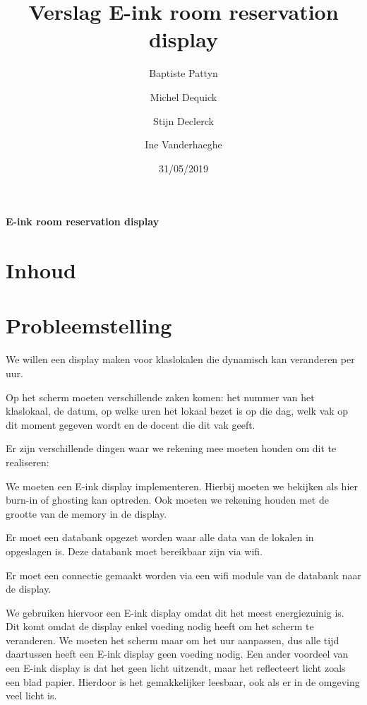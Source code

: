 \documentclass[a4paper,kul]{kulakarticle} %
\date{31/05/2019}
\title{Verslag E-ink room reservation display}
\author{Baptiste Pattyn\and Michel Dequick \and Stijn Declerck \and Ine Vanderhaeghe}
\begin{document}
\maketitle

\begin{center}
	\centering
	\vspace*{\fill}
	\huge
	\textbf{E-ink room reservation display}
	\vspace*{\fill}
\end{center}

\newpage

\section{Inhoud}

\tableofcontents

\newpage

\section{Probleemstelling}

We willen een display maken voor klaslokalen die dynamisch kan veranderen per uur. 

Op het scherm moeten verschillende zaken komen: het nummer van het klaslokaal, de datum, op welke uren het lokaal bezet is op die dag, welk vak op dit moment gegeven wordt en de docent die dit vak geeft.
\newline

Er zijn verschillende dingen waar we rekening mee moeten houden om dit te realiseren:

We moeten een E-ink display implementeren. Hierbij moeten we bekijken als hier burn-in of ghosting kan optreden. Ook moeten we rekening houden met de grootte van de memory in de display.

Er moet een databank opgezet worden waar alle data van de lokalen in opgeslagen is. Deze databank moet bereikbaar zijn via wifi.

Er moet een connectie gemaakt worden via een wifi module van de databank naar de display.
\newline

We gebruiken hiervoor een E-ink display omdat dit het meest energiezuinig is. Dit komt omdat de display enkel voeding nodig heeft om het scherm te veranderen. We moeten het scherm maar om het uur aanpassen, dus alle tijd daartussen heeft een E-ink display geen voeding nodig.
Een ander voordeel van een E-ink display is dat het geen licht uitzendt, maar het reflecteert licht zoals een blad papier. Hierdoor is het gemakkelijker leesbaar, ook als er in de omgeving veel licht is. 
\newline
\end{document}
